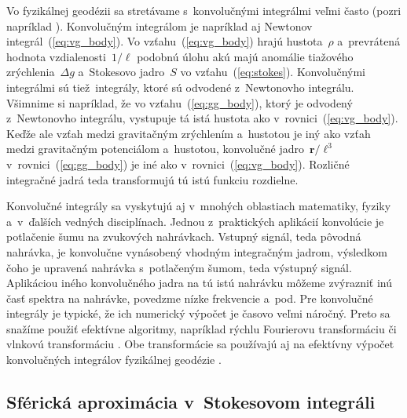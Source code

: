 \documentclass[a4paper, 12pt]{book}
\let\vec\mathbf
\begin{document}
Vo fyzikálnej geodézii sa stretávame s~konvolučnými integrálmi veľmi často 
(pozri napríklad \cite{Jekeli2017}).  Konvolučným integrálom je napríklad aj 
Newtonov integrál~(\ref{eq:vg_body}).  Vo vzťahu~(\ref{eq:vg_body}) hrajú 
hustota~$\rho$ a~prevrátená hodnota vzdialenosti~$1 \slash \ell$ podobnú úlohu 
akú majú anomálie tiažového zrýchlenia~$\Delta g$ a~Stokesovo jadro~$S$ vo 
vzťahu~(\ref{eq:stokes}). Konvolučnými integrálmi sú tiež~integrály, ktoré sú 
odvodené z~Newtonovho integrálu.  Všimnime si napríklad, že vo 
vzťahu~(\ref{eq:gg_body}), ktorý je odvodený z~Newtonovho integrálu, vystupuje 
tá istá hustota ako v~rovnici~(\ref{eq:vg_body}).  Keďže ale vzťah medzi 
gravitačným zrýchlením a~hustotou je iný ako vzťah medzi gravitačným 
potenciálom a~hustotou, konvolučné jadro~$\vec r \slash \ell^3$ 
v~rovnici~(\ref{eq:gg_body}) je iné ako v~rovnici~(\ref{eq:vg_body}).  Rozličné 
integračné jadrá teda transformujú tú istú funkciu rozdielne.

Konvolučné integrály sa vyskytujú aj v~mnohých oblastiach matematiky, fyziky 
a~v~ďalších vedných disciplínach.  Jednou z~praktických aplikácií konvolúcie je 
potlačenie šumu na zvukových nahrávkach.  Vstupný signál, teda pôvodná 
nahrávka, je konvolučne vynásobený vhodným integračným jadrom, výsledkom čoho 
je upravená nahrávka s~potlačeným šumom, teda výstupný signál.  Aplikáciou 
iného konvolučného jadra na tú istú nahrávku môžeme zvýrazniť inú časť spektra 
na nahrávke, povedzme nízke frekvencie a~pod.  Pre konvolučné integrály je 
typické, že ich numerický výpočet je časovo veľmi náročný.  Preto sa snažíme 
použiť efektívne algoritmy, napríklad rýchlu Fourierovu transformáciu 
\parencite{PressNumericalRecipes} či vlnkovú transformáciu 
\parencite{KellerWavelets}.  Obe transformácie sa používajú aj na efektívny 
výpočet konvolučných integrálov fyzikálnej geodézie \parencite[pozri 
napríklad][]{Forsberg1984,Freeden1998a,SansoGeoidDetermination}.


\subsection{Sférická aproximácia v~Stokesovom integráli}
\label{sec:stokes_spherical_approximation}
\end{document}
